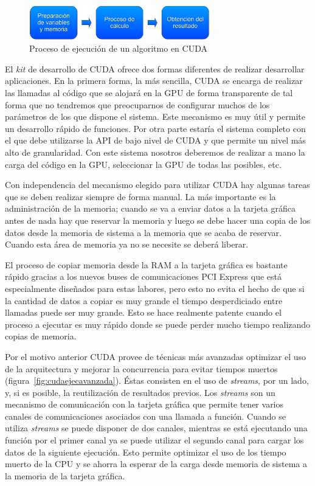 \begin{figure}
	\centering
	\includegraphics[width=0.7\textwidth]{images/proc_ejec1.pdf}
	\caption{Proceso de ejecución de un algoritmo en CUDA}\label{fig:procejecuda}
\end{figure}

El \emph{kit} de desarrollo de CUDA ofrece dos formas diferentes de realizar desarrollar aplicaciones. En la primera forma, la más sencilla, CUDA se encarga de realizar las llamadas al código que se alojará en la GPU de forma transparente de tal forma que no tendremos que preocuparnos de configurar muchos de los parámetros de los que dispone el sistema. Este mecanismo es muy útil y permite un desarrollo rápido de funciones. Por otra parte estaría el sistema completo con el que debe utilizarse la API de bajo nivel de CUDA y que permite un nivel más alto de granularidad. Con este sistema nosotros deberemos de realizar a mano la carga del código en la GPU, seleccionar la GPU de todas las posibles, etc.

Con independencia del mecanismo elegido para utilizar CUDA hay algunas tareas que se deben realizar siempre de forma manual. La más importante es la administración de la memoria; cuando se va a enviar datos a la tarjeta gráfica antes de nada hay que reservar la memoria y luego se debe hacer una copia de los datos desde la memoria de sistema a la memoria que se acaba de reservar. Cuando esta área de memoria ya no se necesite se deberá liberar.

El proceso de copiar memoria desde la RAM a la tarjeta gráfica es bastante rápido gracias a los nuevos buses de comunicaciones PCI Express que está especialmente diseñados para estas labores, pero esto no evita el hecho de que si la cantidad de datos a copiar es muy grande el tiempo desperdiciado entre llamadas puede ser muy grande. Esto se hace realmente patente cuando el proceso a ejecutar es muy rápido donde se puede perder mucho tiempo realizando copias de memoria.

Por el motivo anterior CUDA provee de técnicas más avanzadas optimizar el uso de la arquitectura y mejorar la concurrencia para evitar tiempos muertos (figura~\ref{fig:cudaejecavanzada}). Éstas consisten en el uso de \emph{streams}, por un lado, y, si es posible, la reutilización de resultados previos. Los \emph{streams} son un mecanismo de comunicación con la tarjeta gráfica que permite tener varios canales de comunicaciones asociados con una llamada a función. Cuando se utiliza \emph{streams} se puede disponer de dos canales, mientras se está ejecutando una función por el primer canal ya se puede utilizar el segundo canal para cargar los datos de la siguiente ejecución. Esto permite optimizar el uso de los tiempo muerto de la CPU y se ahorra la esperar de la carga desde memoria de sistema a la memoria de la tarjeta gráfica.

